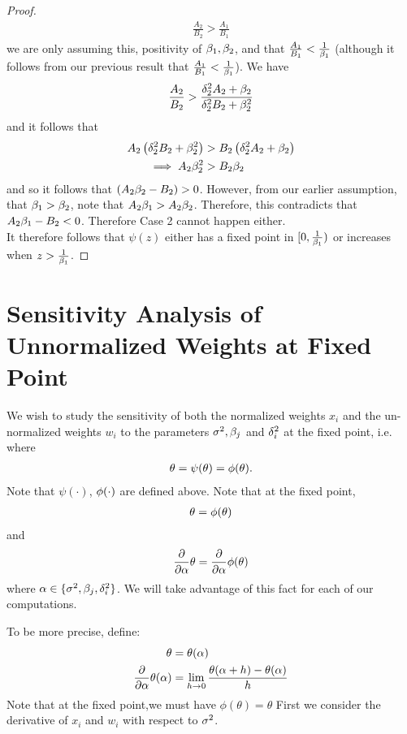 \documentclass[12pt,leqno,letterpaper]{article}
\begin{document}
\begin{proof}
\begin{align}
\frac{A_2}{B_2}> \frac{A_1}{B_1}
\end{align}
we are only assuming this, positivity of $\beta_1, \beta_2$, and that $\frac{A_1}{B_1}< \frac{1}{\beta_1}$ (although it follows from our previous result that $\frac{A_1}{B_1}< \frac{1}{\beta_1}$).  We have
\begin{align}
\frac{A_2}{B_2}>\frac{\delta_2^2 A_2 + \beta_2}{\delta_2^2 B_2 + \beta_2^2}
\end{align}
and it follows that
\begin{align}
A_2 \left(\delta_2^2 B_2 + \beta_2^2\right) &> B_2\left(\delta_2^2 A_2 + \beta_2\right) \\
\implies A_2 \beta_2^2  &> B_2  \beta_2
\end{align}
and so it follows that $\left(A_2 \beta_2 - B_2\right)>0$.  However, from our earlier assumption, that $\beta_1>\beta_2$, note that $A_2 \beta_1 > A_2 \beta_2$.  Therefore, this contradicts that $A_2 \beta_1-B_2<0$.  Therefore Case 2 cannot happen either.\\
It therefore follows that $\psi(z)$ either has a fixed point in $[0,\frac{1}{\beta_1})$ or increases when $z> \frac{1}{\beta_1}$.
\end{proof}
\newpage
\section{Sensitivity Analysis of Unnormalized Weights at Fixed Point}
We wish to study the sensitivity of both the normalized weights $x_i$ and the un-normalized weights $w_i$ to the parameters $\sigma^2,\beta_j$ and $\delta_i^2$ at the fixed point, i.e. where 
\begin{align}
\theta = \psi(\theta)= \phi(\theta).
\end{align}
Note that $\psi(\cdot)$, $\phi(\cdot)$ are defined above.  Note that at the fixed point, 
\begin{align}
\theta=\phi(\theta)
\end{align}
and 
\begin{align}
\frac{\partial }{ \partial {\alpha}} \theta = \frac{\partial }{ \partial {\alpha}} \phi(\theta)
\end{align}
where $\alpha \in \{\sigma^2, \beta_j, \delta_i^2 \}$.  We will take advantage of this fact for each of our computations.\par
To be more precise, define:
\begin{align}
\theta &= \theta(\alpha)\\
\frac{\partial }{ \partial {\alpha}} \theta(\alpha) &= \lim_{h \to 0} \frac{\theta(\alpha+h)-\theta(\alpha)}{h}
\end{align}
Note that at the fixed point,we must have $\phi(\theta)=\theta$
First we consider the derivative of $x_i$ and $w_i$ with respect to $\sigma^2$.
\newpage
\end{document}
